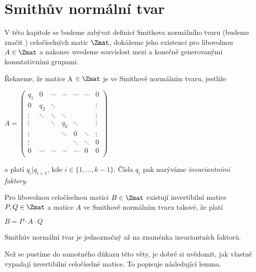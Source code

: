 \chapter{Smithův normální tvar}
\setcounter{page}{1}

V této kapitole se budeme zabývat definicí Smithova normálního tvaru
(budeme značit \snf{}) celočíselných matic $\Zmat$, dokážeme jeho existenci pro
libovolnou $A \in \Zmat$ a nakonec uvedeme souvislost mezi \snf{} a konečně
generovanými komutativními grupami.

\begin{defi}Řekneme, že matice A $ \in \Zmat $ je ve Smithově normálním tvaru, jestliže
\begin{center}
$ A =
    \begin{pmatrix}
        q_1     & 0      & \cdots & \cdots & \cdots & \cdots & 0      \\
        0       & q_2    & \ddots &        &        &        & \vdots \\
        \vdots  & \ddots & \ddots & \ddots &        &        & \vdots \\
        \vdots  &        & \ddots & q_k    & \ddots &        & \vdots \\
        \vdots  &        &        & \ddots & 0      & \ddots & \vdots \\
        \vdots  &        &        &        & \ddots & \ddots & 0      \\
        0       & \cdots & \cdots & \cdots & \cdots & 0      & 0      \\
    \end{pmatrix}
$
\end{center}
a platí $q_i | q_{i+1}$, kde $i \in \{1, \dots, k-1\}$. Čísla $q_i$ pak nazýváme
\textit{invariantními faktory}.
\end{defi}


\begin{vet}
    Pro libovolnou celočíselnou matici $ B \in \Zmat $ existují invertibilní
    matice $ P,Q \in \Zmat $ a matice $ A $ ve Smithově normálním tvaru takové,
    že platí
    \begin{center}
        $ B = P \cdot A \cdot Q $
    \end{center}
    Smithův normální tvar je jednoznačný až na znaménka invariantních faktorů.
\end{vet}


Než se pustíme do samotného důkazu této věty, je dobré si uvědomit, jak vlastně
vypadají invertibilní celočíselné matice. To popisuje následující lemma.


